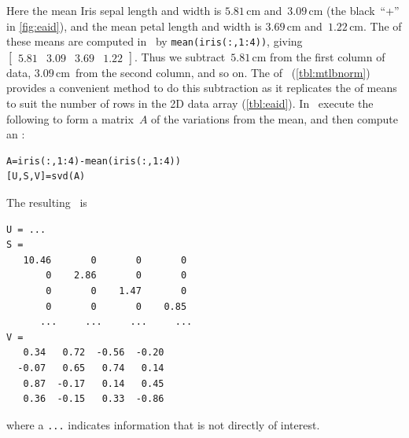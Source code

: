 \begin{example}
\begin{solution}
\begin{enumerate}
Here the mean Iris sepal length and width is \(5.81\)\,cm and~\(3.09\)\,cm (the black~``+'' in \cref{fig:eaid}), and the mean petal length and width is \(3.69\)\,cm and~\(1.22\)\,cm.
The  of these means are computed in \script\ by \verb|mean(iris(:,1:4))|, giving \(\begin{bmatrix} 5.81&3.09&3.69&1.22 \end{bmatrix}\).
Thus we subtract~\(5.81\)\,cm from the first column of data, \(3.09\)\,cm~from the second column, and so on.
The  of \script\ (\cref{tbl:mtlbnorm}) provides a convenient method to do this subtraction as it replicates the  of means to suit the number of rows in the 2D data array (\cref{tbl:eaid}).
In \script\ execute the following to form a matrix~\(A\) of the variations from the mean, and then compute an \svd:%
\begin{verbatim}
A=iris(:,1:4)-mean(iris(:,1:4))
[U,S,V]=svd(A)
\end{verbatim}
\setbox\ajrqrbox\hbox{}%
\marginajrbox%
The resulting \svd\ is \twodp
\begin{verbatim}
U = ...
S =
   10.46       0       0       0
       0    2.86       0       0
       0       0    1.47       0
       0       0       0    0.85
      ...     ...     ...     ...
V =
   0.34   0.72  -0.56  -0.20
  -0.07   0.65   0.74   0.14
   0.87  -0.17   0.14   0.45
   0.36  -0.15   0.33  -0.86
\end{verbatim}
where a \verb|...| indicates information that is not directly of interest.


\end{enumerate}
\end{solution}
\end{example}
